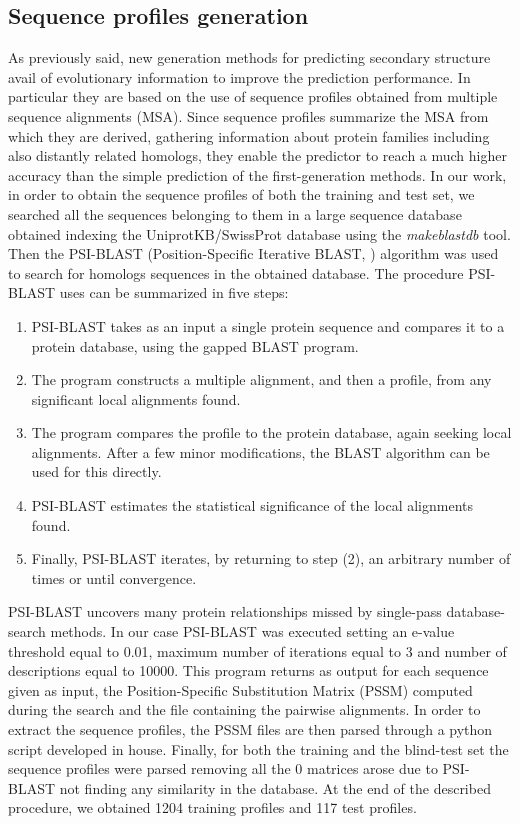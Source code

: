 \documentclass[nocrop]{bioinfo}
\begin{document}
\begin{methods}
\subsection{Sequence profiles generation}
As previously said, new generation methods for predicting secondary structure avail of evolutionary information to improve the prediction performance. In particular they are based on the use of sequence profiles obtained from multiple sequence alignments (MSA). Since sequence profiles summarize the MSA from which they are derived, gathering information about protein families including also distantly related homologs, they enable the predictor to reach a much higher accuracy than the simple prediction of the first-generation methods. 
In our work, in order to obtain the sequence profiles of both the training and test set, we searched all the sequences belonging to them in a large sequence database obtained indexing the UniprotKB/SwissProt database \citep{uniprot2019uniprot} using the \textit{makeblastdb} tool. Then the PSI-BLAST (Position-Specific Iterative BLAST, \citep{altschul1997gapped}) algorithm was used to search for homologs sequences in the obtained database. The procedure PSI-BLAST uses can be summarized in five steps:
\begin{enumerate}
    \item PSI-BLAST takes as an input a single protein sequence and compares it to a protein database, using the gapped BLAST program.
    \item The program constructs a multiple alignment, and then a profile, from any significant local alignments found.
    \item The program compares the profile to the protein database, again seeking local alignments. After a few minor modifications, the BLAST algorithm can be used for this directly.
    \item PSI-BLAST estimates the statistical significance of the local alignments found.
    \item Finally, PSI-BLAST iterates, by returning to step (2), an arbitrary number of times or until convergence.
\end{enumerate}
PSI-BLAST uncovers many protein relationships missed by single-pass database-search methods. In our case PSI-BLAST was executed setting an e-value threshold equal to 0.01, maximum number of iterations equal to 3 and number of descriptions equal to 10000. This program returns as output for each sequence given as input, the Position-Specific Substitution Matrix (PSSM) computed during the search and the file containing the pairwise alignments. In order to extract the sequence profiles, the PSSM files are then parsed through a python script developed in house. Finally, for both the training and the blind-test set the sequence profiles were parsed removing all the 0 matrices arose due to PSI-BLAST not finding any similarity in the database. At the end of the described procedure, we obtained 1204 training profiles and 117 test profiles. 


\end{methods}
\end{document}
